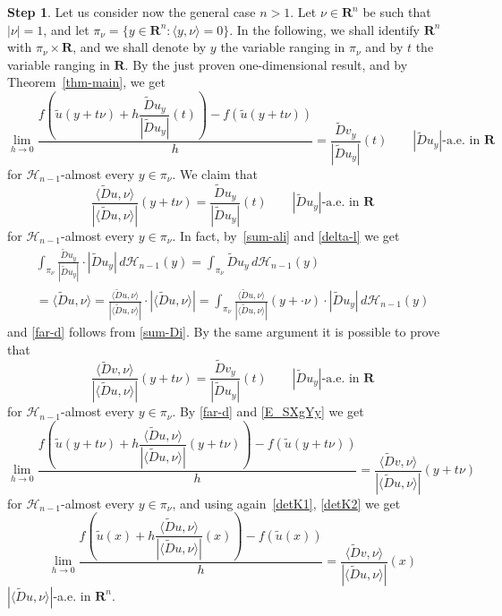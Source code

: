\documentclass[manuscript, printscheme]{aomart}
\newtheorem[{}\it]{thm}{Theorem}[section]
\theoremstyle{definition}
\newtheorem*[{}\it]{notation}{Notation}
\newtheorem{step}{Step}
\newcommand{\thmref}[1]{Theorem~\ref{#1}}
\newcommand{\wt}{\widetilde}
\newcommand{\envert}[1]{\left\lvert#1\right\rvert}
\let\abs=\envert
\begin{document}
\begin{step}
Let us consider now the general case $n>1$. Let $\nu\in \mathbf{R}^n$ be
such that $\abs{\nu}=1$, and let $\pi_\nu=\{y\in\mathbf{R}^n: \langle
y,\nu\rangle =0\}$. In the following, we shall identify $\mathbf{R}^n$
with $\pi_\nu\times\mathbf{R}$, and we shall denote by $y$ the variable
ranging in $\pi_\nu$ and by $t$ the variable ranging in $\mathbf{R}$. By
the just proven one-dimensional result, and by \thmref{thm-main}, we get
\[\lim_{h\to 0}\frac{f(\tilde u(y+t\nu)+h\dfrac{\wt{D}u_y}{\abs{
\wt{D}u_y}}(t))-f(\tilde u(y+t\nu))}h=\frac{\wt{D}v_y}{\abs{
\wt{D}u_y}}(t)\qquad\abs{\wt{D}u_y}\text{-a.e. in }\mathbf{R}\]
for $\mathcal{H}_{n-1}$-almost every $y\in \pi_\nu$. We claim that
\begin{equation}
\frac{\langle \wt{D}u,\nu\rangle }{\abs{\langle \wt{D}u,\nu\rangle
}}(y+t\nu)=\frac{\wt{D}u_y}
{\abs{\wt{D}u_y}}(t)\qquad\abs{\wt{D}u_y}\text{-a.e. in }\mathbf{R}
\end{equation}
for $\mathcal{H}_{n-1}$-almost every $y\in\pi_\nu$. In fact,
by~\eqref{sum-ali} and \eqref{delta-l} we get
\begin{multline*}
\int_{\pi_\nu}\frac{\wt{D}u_y}{\abs{\wt{D}u_y}}\cdot\abs{\wt{D}u_y
}\,d\mathcal{H}_{n-1}(y)=\int_{\pi_\nu}\wt{D}u_y\,d\mathcal{H}_{n-1}(y)\\
=\langle \wt{D}u,\nu\rangle =\frac
{\langle \wt{D}u,\nu\rangle }{\abs{\langle \wt{D}u,\nu\rangle}}\cdot
\abs{\langle \wt{D}u,\nu\rangle }=\int_{\pi_\nu}\frac{
\langle \wt{D}u,\nu\rangle }{\abs{\langle \wt{D}u,\nu\rangle }}
(y+\cdot \nu)\cdot\abs{\wt{D}u_y}\,d\mathcal{H}_{n-1}(y)
\end{multline*}
and \eqref{far-d} follows from \eqref{sum-Di}. By the same argument it
is possible to prove that
\begin{equation}
\frac{\langle \wt{D}v,\nu\rangle }{\abs{\langle \wt{D}u,\nu\rangle
}}(y+t\nu)=\frac{\wt{D}v_y}{\abs{\wt{D}u_y}}(t)\qquad\abs{
\wt{D}u_y}\text{-a.e. in }\mathbf{R}\end{equation}
for $\mathcal{H}_{n-1}$-almost every $y\in \pi_\nu$. By \eqref{far-d}
and \eqref{E_SXgYy} we get
\[
\lim_{h\to 0}\frac{f(\tilde u(y+t\nu)+h\dfrac{\langle \wt{D}
u,\nu\rangle }{\abs{\langle \wt{D}u,\nu\rangle }}(y+t\nu))-f(\tilde
u(y+t\nu))}{h}
=\frac{\langle \wt{D}v,\nu\rangle }{\abs{\langle
\wt{D}u,\nu\rangle }}(y+t\nu)\]
for $\mathcal{H}_{n-1}$-almost every $y\in\pi_\nu$, and using again~\eqref{detK1}, \eqref{detK2} we get
\[
\lim_{h\to 0}\frac{f(\tilde u(x)+h\dfrac{\langle
\wt{D}u,\nu\rangle }{\abs{\langle \wt{D}u,\nu\rangle }}(x))-f(\tilde
u(x))}{h}=\frac{\langle \wt{D}v,\nu\rangle }{\abs{\langle \wt{D}u,\nu
\rangle }}(x)
\]
$\abs{\langle \wt{D}u,\nu\rangle}$-a.e. in $\mathbf{R}^n$.


\end{step}
\end{document}
